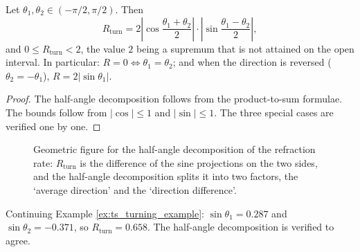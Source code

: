 \begin{theorem}\label{thm:ts_refraction_relation}
Let $\theta_1, \theta_2 \in (-\pi/2, \pi/2)$. Then
\[
R_{\text{turn}} = 2\left| \cos\frac{\theta_1 + \theta_2}{2} \right| \cdot \left| \sin\frac{\theta_1 - \theta_2}{2} \right|,
\]
and $0 \le R_{\text{turn}} < 2$, the value $2$ being a supremum that is not attained on the open interval. In particular: $R = 0 \iff \theta_1 = \theta_2$; and when the direction is reversed ($\theta_2 = -\theta_1$), $R = 2|\sin\theta_1|$.
\end{theorem}

\begin{proof}
The half-angle decomposition follows from the product-to-sum formulae. The bounds follow from $|\cos| \le 1$ and $|\sin| \le 1$. The three special cases are verified one by one.
\end{proof}

\begin{figure}[htbp]
\centering
{}
\caption{Geometric figure for the half-angle decomposition of the refraction rate: $R_{\text{turn}}$ is the difference of the sine projections on the two sides, and the half-angle decomposition splits it into two factors, the `average direction' and the `direction difference'.}
\label{fig:refraction_decomposition}
\end{figure}

\begin{example}\label{ex:ts_refraction_example}
Continuing Example \ref{ex:ts_turning_example}: $\sin\theta_1 = 0.287$ and $\sin\theta_2 = -0.371$, so $R_{\text{turn}} = 0.658$. The half-angle decomposition is verified to agree.
\end{example}

